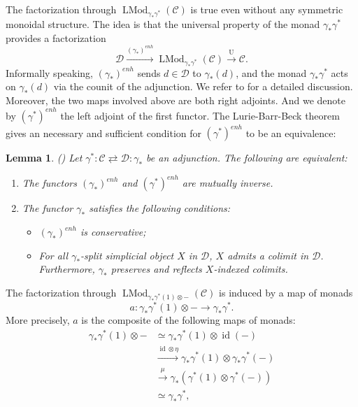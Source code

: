 \documentclass{article}
\newtheorem{lm}[thm]{Lemma}
\theoremstyle{definition}
\newcommand{\on}{\operatorname}
\begin{document}
The factorization through $\on{LMod}_{\gamma_\ast\gamma^\ast}(\mathcal{C})$ is true even without any symmetric monoidal structure. The idea is that the universal property of the monad $\gamma_\ast\gamma^\ast$ provides a factorization\[
\mathcal{D}\xrightarrow{(\gamma_\ast)^{enh}}\on{LMod}_{\gamma_\ast\gamma^\ast}(\mathcal{C})\xrightarrow{\on{U}}\mathcal{C}.\]
Informally speaking, $(\gamma_\ast)^{enh}$ sends $d\in\mathcal{D}$ to $\gamma_\ast(d)$, and the monad $\gamma_\ast\gamma^\ast$ acts on $\gamma_\ast(d)$ via the counit of the adjunction. We refer to \cite[proposition 4.7.3.3]{HA} for a detailed discussion. Moreover, the two maps involved above are both right adjoints. And we denote by $(\gamma^\ast)^{enh}$ the left adjoint of the first functor. The Lurie-Barr-Beck theorem gives an necessary and sufficient condition for $(\gamma^\ast)^{enh}$ to be an equivalence:
\begin{lm}(\cite[Theorem 4.7.3.5]{HA})
Let $\gamma^\ast: \mathcal{C} \rightleftarrows \mathcal{D}: \gamma_\ast$ be an adjunction. The following are equivalent:
\begin{enumerate}
\item The functors $(\gamma_\ast)^{enh}$ and $(\gamma^\ast)^{enh}$ are mutually inverse.
\item The functor $\gamma_\ast$ satisfies the following conditions:
\begin{itemize}
\item $(\gamma_\ast)^{enh}$ is conservative;
\item For all $\gamma_\ast$-split simplicial object $X$ in $\mathcal{D}$, $X$ admits a colimit in $\mathcal{D}$. Furthermore, $\gamma_\ast$ preserves and reflects $X$-indexed colimits.
\end{itemize}
\end{enumerate}
\end{lm}
The factorization through $\on{LMod}_{\gamma_\ast\gamma^\ast(1)\otimes-}(\mathcal{C})$ is induced by a map of monads \[a: \gamma_\ast\gamma^\ast(1)\otimes-\rightarrow\gamma_\ast\gamma^\ast.\]More precisely, $a$ is the composite of the following maps of monads:\[
\begin{aligned}
\gamma_\ast\gamma^\ast(1)\otimes- &\simeq \gamma_\ast\gamma^\ast(1)\otimes\on{id}(-)\\
&\xrightarrow{\on{id}\otimes\eta}\gamma_\ast\gamma^\ast(1)\otimes\gamma_\ast\gamma^\ast(-)\\
&\xrightarrow{\mu}\gamma_\ast(\gamma^\ast(1)\otimes\gamma^\ast(-))\\
&\simeq\gamma_\ast\gamma^\ast,
\end{aligned}\] 
\end{document}
